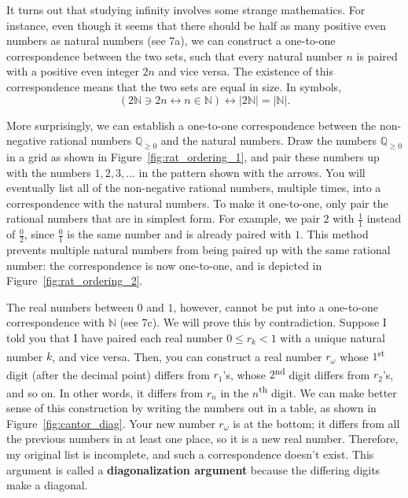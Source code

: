 \documentclass[../textbook.tex]{subfiles}
\begin{document}
\noindent It turns out that studying infinity involves some strange mathematics. For instance, even though it seems that there should be half as many positive even numbers as natural numbers (see 7a), we can construct a one-to-one correspondence between the two sets, such that every natural number $n$ is paired with a positive even integer $2n$ and vice versa. The existence of this correspondence means that the two sets are equal in size. In symbols, $$(2\mathbb{N} \ni 2n \leftrightarrow n \in \mathbb{N}) \leftrightarrow |2\mathbb{N}|=|\mathbb{N}|.$$ %

\noindent More surprisingly, we can establish a one-to-one correspondence between the non-negative rational numbers $\mathbb{Q}_{\geq 0}$ and the natural numbers. Draw the numbers $\mathbb{Q}_{\geq 0}$ in a grid as shown in Figure~\ref{fig:rat_ordering_1}, and pair these numbers up with the numbers $1,2,3,...$ in the pattern shown with the arrows. You will eventually list all of the non-negative rational numbers, multiple times, into a correspondence with the natural numbers. To make it
one-to-one, only pair the rational numbers that are in simplest form. For example, we pair $2$ with $\frac{1}{1}$ instead of $\frac{0}{2}$, since $\frac{0}{1}$ is the same number and is already paired with $1$. This method prevents multiple natural numbers from being paired up with the same rational number: the correspondence is now one-to-one, and is depicted in Figure~\ref{fig:rat_ordering_2}.

The real numbers between $0$ and $1$, however, cannot be put into a one-to-one correspondence with $\mathbb{N}$ (see 7c). We will prove this by contradiction. Suppose I told you that I have paired each real number $0 \leq r_k < 1$ with a unique natural number $k$, and vice versa. Then, you can construct a real number $r_\omega$ whose $1$\textsuperscript{st} digit (after the decimal point) differs from $r_1$’s, whose $2$\textsuperscript{nd} digit differs from $r_2$’s, and so on. In other words, it differs from $r_n$ in the $n$\textsuperscript{th} digit. We can make better sense of this construction by writing the numbers out in a table, as shown in Figure~\ref{fig:cantor_diag}. Your new number $r_\omega$ is at the bottom; it differs from all the previous numbers in at least one place, so it is a new real number. Therefore, my original list is incomplete, and such a correspondence doesn’t exist. This argument is called a \textbf{diagonalization argument} because the differing digits make a diagonal. %
\end{document}
